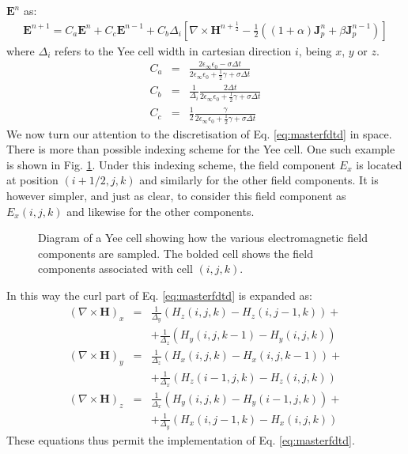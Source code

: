 \documentclass[a4paper, 12pt]{article}
\begin{document}
	$\boldsymbol{E}^n$ as:
	\begin{eqnarray}
		\boldsymbol{E}^{n+1}=C_a\boldsymbol{E}^n+C_c\boldsymbol{E}^{n-1}+C_b\Delta_i\left[\nabla\times\boldsymbol{H}^{n+\frac{1}{2}}-\frac{1}{2}\left((1+\alpha)\boldsymbol{J}_p^{n}+\beta\boldsymbol{J}_p^{n-1}\right)\right]\label{eq:masterfdtd}
	\end{eqnarray}
	where $\Delta_i$ refers to the Yee cell width in cartesian direction
	$i$, being $x$, $y$ or $z$.
	\begin{eqnarray}
		C_a&=&\frac{2\epsilon_\infty\epsilon_0-\sigma\Delta
			t}{2\epsilon_\infty\epsilon_0+\frac{1}{2}\gamma+\sigma\Delta t}\nonumber\\
		C_b&=&\frac{1}{\Delta_i}\frac{2\Delta
			t}{2\epsilon_\infty\epsilon_0+\frac{1}{2}\gamma+\sigma\Delta t}\nonumber\\
		C_c&=&\frac{1}{2}\frac{\gamma}{2\epsilon_\infty\epsilon_0+\frac{1}{2}\gamma+\sigma\Delta t}\label{eq:berengerC}
	\end{eqnarray}
	We now turn our attention to the discretisation of
	Eq. \ref{eq:masterfdtd} in space. There is more than possible indexing
	scheme for the Yee cell. One such example is shown in
	Fig. \ref{fig:yeediag}. Under this indexing scheme, the field
	component $E_x$ is located at position $(i+1/2,j,k)$ and similarly
	for the other field components. It is however simpler, and just as
	clear, to consider this field component as $E_x(i,j,k)$ and likewise
	for the other components. \begin{figure}[h]
		\centering
		\caption{Diagram of a Yee cell showing how the various electromagnetic field
			components are sampled. The bolded cell shows the field components
			associated with cell $(i,j,k)$.}
		\label{fig:yeediag}
	\end{figure}In this way the curl part of Eq. \ref{eq:masterfdtd} is
	expanded as:
	\begin{eqnarray}
		\left(\nabla\times\boldsymbol{H}\right)_x&=&\frac{1}{\Delta_y}(H_z(i,j,k)-H_z(i,j-1,k))+\nonumber\\&&+\frac{1}{\Delta_z}(H_y(i,j,k-1)-H_y(i,j,k))\\
		\left(\nabla\times\boldsymbol{H}\right)_y&=&\frac{1}{\Delta_z}(H_x(i,j,k)-H_x(i,j,k-1))+\nonumber\\&&+\frac{1}{\Delta_x}(H_z(i-1,j,k)-H_z(i,j,k))\\
		\left(\nabla\times\boldsymbol{H}\right)_z&=&\frac{1}{\Delta_x}(H_y(i,j,k)-H_y(i-1,j,k))+\nonumber\\&&+\frac{1}{\Delta_y}(H_x(i,j-1,k)-H_x(i,j,k))
	\end{eqnarray}
	These equations thus permit the implementation of
	Eq. \ref{eq:masterfdtd}.
\end{document}
